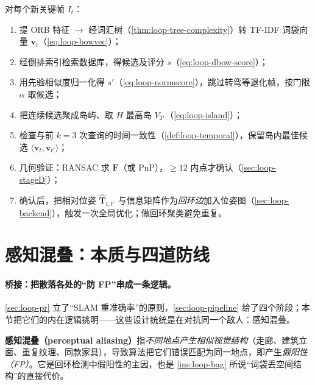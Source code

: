\begin{algo}[完整视觉回环检测流水线]\label{alg:loop-pipeline}
对每个新关键帧 $I_t$：
\begin{enumerate}
  \item 提 ORB 特征 $\to$ 经词汇树（\cref{thm:loop-tree-complexity}）转 TF-IDF 词袋向量 $\boldsymbol v_t$（\cref{eq:loop-bowvec}）；
  \item 经倒排索引检索数据库，得候选及评分 $s$（\cref{eq:loop-dbow-score}）；
  \item 用先验相似度归一化得 $s'$（\cref{eq:loop-normscore}），跳过转弯等退化帧，按门限 $\alpha$ 取候选；
  \item 把连续候选聚成岛屿、取 $H$ 最高岛 $V_{T'}$（\cref{eq:loop-island}）；
  \item 检查与前 $k=3$ 次查询的时间一致性（\cref{def:loop-temporal}），保留岛内最佳候选 $\langle\boldsymbol v_t,\boldsymbol v_{t'}\rangle$；
  \item 几何验证：RANSAC 求 $\mathbf F$（或 PnP），$\ge 12$ 内点才确认（\cref{sec:loop-stageD}）；
  \item 确认后，把相对位姿 $\hat{\mathbf T}_{t,t'}$ 与信息矩阵作为\emph{回环边}加入位姿图（\cref{sec:loop-backend}），触发一次全局优化；做回环聚类避免重复。
\end{enumerate}
\end{algo}

\section{感知混叠：本质与四道防线}
\label{sec:loop-pitfalls}

\paragraph{桥接：把散落各处的“防 FP”串成一条逻辑。}
\cref{sec:loop-pr} 立了“SLAM 重准确率”的原则，\cref{sec:loop-pipeline} 给了四个阶段；本节把它们的内在逻辑挑明——这些设计统统是在对抗同一个敌人：感知混叠。

\begin{definition}[感知混叠]\label{def:loop-aliasing}
\textbf{感知混叠（perceptual aliasing）}指\emph{不同地点产生相似视觉结构}（走廊、建筑立面、重复纹理、同款家具），导致算法把它们错误匹配为同一地点，即产生\emph{假阳性（FP）}\cite{cummins2008fabmap}。它是回环检测中假阳性的主因，也是 \cref{ins:loop-bag} 所说“词袋丢空间结构”的直接代价。
\end{definition}

